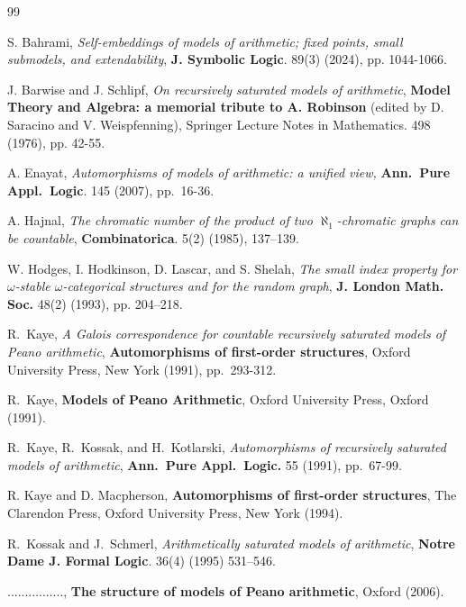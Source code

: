 \documentclass[11pt]{article}
\theoremstyle{plain}
\theoremstyle{definition}
\begin{document}
\begin{thebibliography}{99}
	
	 S. Bahrami, \textit{Self-embeddings of models of arithmetic; fixed points, small submodels, and extendability}, \textbf{J. Symbolic Logic}. 89(3) (2024), pp. 1044-1066.
	


	
 J. Barwise and J. Schlipf,\textit{ On recursively saturated models of arithmetic}, \textbf{Model Theory and Algebra: a memorial tribute to A. Robinson} (edited by D. Saracino and V. Weispfenning), Springer Lecture Notes in Mathematics. 498 (1976), pp. 42-55. 





 A. Enayat, \textit{Automorphisms of
	models of arithmetic: a unified view, }\textbf{Ann.~Pure Appl.~Logic}. 145
(2007), pp.~16-36.

 A. Hajnal, \textit{The chromatic number of the product of two
	$\aleph_{1}$-chromatic graphs can be countable}, \textbf{Combinatorica}. 5(2) (1985), 137–139.


 W. Hodges, I. Hodkinson, D. Lascar,  and  S. Shelah,  \textit{The small index property for $\omega$-stable $\omega$-categorical structures and for the random graph}, \textbf{J. London Math. Soc.}  48(2) (1993), pp. 204–218.

  R.~Kaye, \textit{A Galois correspondence for countable recursively saturated models of Peano arithmetic}, \textbf{Automorphisms of first-order structures}, Oxford University Press, New York (1991),  pp.~293-312. \cite{km}

 R.~Kaye, \textbf{Models of Peano Arithmetic}, Oxford University Press, Oxford (1991).

 R.~Kaye, R.~Kossak, and H.~Kotlarski, \textit{Automorphisms of recursively saturated models of arithmetic}, \textbf{Ann.~Pure Appl.~Logic.} 55 (1991), pp.~67-99.

 R. Kaye and D. Macpherson,  \textbf{Automorphisms
of first-order structures},  The Clarendon Press, Oxford University Press, New York (1994). 



  R.~Kossak and J.~Schmerl, \textit{Arithmetically saturated
 models of arithmetic}, \textbf{Notre Dame J. Formal Logic}. 36(4) (1995) 531–546.


 ................,  \textbf{The structure of models of Peano arithmetic}, Oxford (2006).




\end{thebibliography}
\end{document}
